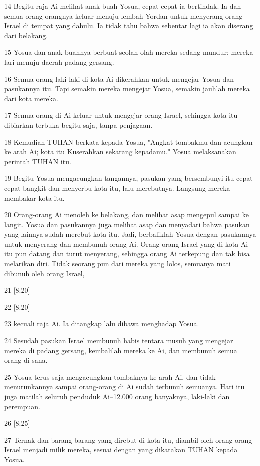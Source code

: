 \par 14 Begitu raja Ai melihat anak buah Yosua, cepat-cepat ia bertindak. Ia dan semua orang-orangnya keluar menuju lembah Yordan untuk menyerang orang Israel di tempat yang dahulu. Ia tidak tahu bahwa sebentar lagi ia akan diserang dari belakang.
\par 15 Yosua dan anak buahnya berbuat seolah-olah mereka sedang mundur; mereka lari menuju daerah padang gersang.
\par 16 Semua orang laki-laki di kota Ai dikerahkan untuk mengejar Yosua dan pasukannya itu. Tapi semakin mereka mengejar Yosua, semakin jauhlah mereka dari kota mereka.
\par 17 Semua orang di Ai keluar untuk mengejar orang Israel, sehingga kota itu dibiarkan terbuka begitu saja, tanpa penjagaan.
\par 18 Kemudian TUHAN berkata kepada Yosua, "Angkat tombakmu dan acungkan ke arah Ai; kota itu Kuserahkan sekarang kepadamu." Yosua melaksanakan perintah TUHAN itu.
\par 19 Begitu Yosua mengacungkan tangannya, pasukan yang bersembunyi itu cepat-cepat bangkit dan menyerbu kota itu, lalu merebutnya. Langsung mereka membakar kota itu.
\par 20 Orang-orang Ai menoleh ke belakang, dan melihat asap mengepul sampai ke langit. Yosua dan pasukannya juga melihat asap dan menyadari bahwa pasukan yang lainnya sudah merebut kota itu. Jadi, berbaliklah Yosua dengan pasukannya untuk menyerang dan membunuh orang Ai. Orang-orang Israel yang di kota Ai itu pun datang dan turut menyerang, sehingga orang Ai terkepung dan tak bisa melarikan diri. Tidak seorang pun dari mereka yang lolos, semuanya mati dibunuh oleh orang Israel,
\par 21 [8:20]
\par 22 [8:20]
\par 23 kecuali raja Ai. Ia ditangkap lalu dibawa menghadap Yosua.
\par 24 Sesudah pasukan Israel membunuh habis tentara musuh yang mengejar mereka di padang gersang, kembalilah mereka ke Ai, dan membunuh semua orang di sana.
\par 25 Yosua terus saja mengacungkan tombaknya ke arah Ai, dan tidak menurunkannya sampai orang-orang di Ai sudah terbunuh semuanya. Hari itu juga matilah seluruh penduduk Ai--12.000 orang banyaknya, laki-laki dan perempuan.
\par 26 [8:25]
\par 27 Ternak dan barang-barang yang direbut di kota itu, diambil oleh orang-orang Israel menjadi milik mereka, sesuai dengan yang dikatakan TUHAN kepada Yosua.

